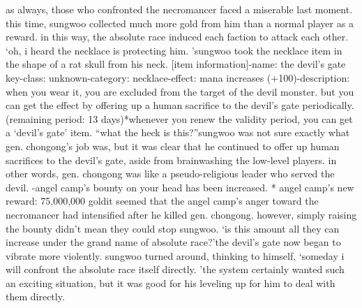 as always, those who confronted the necromancer faced a miserable last moment.
this time, sungwoo collected much more gold from him than a normal player as a reward.
in this way, the absolute race induced each faction to attack each other.
‘oh, i heard the necklace is protecting him.
’sungwoo took the necklace item in the shape of a rat skull from his neck.
[item information]-name: the devil’s gate key-class: unknown-category: necklace-effect: mana increases (+100)-description: when you wear it, you are excluded from the target of the devil monster.
 but you can get the effect by offering up a human sacrifice to the devil’s gate periodically.
 (remaining period: 13 days)*whenever you renew the validity period, you can get a ‘devil’s gate’ item.
“what the heck is this?”sungwoo was not sure exactly what gen.
 chongong’s job was, but it was clear that he continued to offer up human sacrifices to the devil’s gate, aside from brainwashing the low-level players.
in other words, gen.
 chongong was like a pseudo-religious leader who served the devil.
-angel camp’s bounty on your head has been increased.
* angel camp’s new reward: 75,000,000 goldit seemed that the angel camp’s anger toward the necromancer had intensified after he killed gen.
 chongong.
 however, simply raising the bounty didn’t mean they could stop sungwoo.
‘is this amount all they can increase under the grand name of absolute race?’the devil’s gate now began to vibrate more violently.
sungwoo turned around, thinking to himself, ‘someday i will confront the absolute race itself directly.
’the system certainly wanted such an exciting situation, but it was good for his leveling up for him to deal with them directly.


 